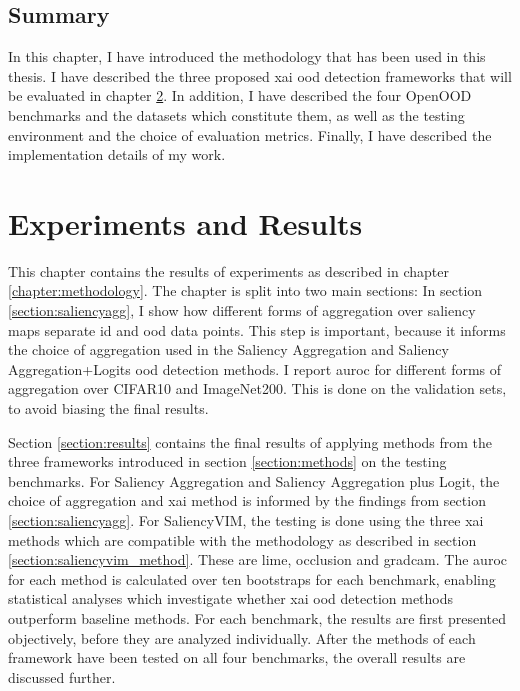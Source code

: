 \documentclass[UKenglish]{uiomasterthesis} %
\theoremstyle{definition}
\begin{document}
\section{Summary}

In this chapter, I have introduced the methodology that has been used in this thesis. I have described the three proposed \ac{xai} \ac{ood} detection frameworks that will be evaluated in chapter \ref{chapter:experiments}. In addition, I have described the four OpenOOD benchmarks and the datasets which constitute them, as well as the testing environment and the choice of evaluation metrics. Finally, I have described the implementation details of my work.

\chapter{Experiments and Results} \label{chapter:experiments}

This chapter contains the results of experiments as described in chapter \ref{chapter:methodology}. The chapter is split into two main sections: In section \ref{section:saliencyagg}, I show how different forms of aggregation over saliency maps separate \ac{id} and \ac{ood} data points. This step is important, because it informs the choice of aggregation used in the Saliency Aggregation and Saliency Aggregation+Logits \ac{ood} detection methods. I report \ac{auroc} for different forms of aggregation over CIFAR10 and ImageNet200. This is done on the validation sets, to avoid biasing the final results.

Section \ref{section:results} contains the final results of applying methods from the three frameworks introduced in section \ref{section:methods} on the testing benchmarks. For Saliency Aggregation and Saliency Aggregation plus Logit, the choice of aggregation and \ac{xai} method is informed by the findings from section \ref{section:saliencyagg}. For SaliencyVIM, the testing is done using the three \ac{xai} methods which are compatible with the methodology as described in section \ref{section:saliencyvim_method}. These are \ac{lime}, occlusion and \ac{gradcam}. The \ac{auroc} for each method is calculated over ten bootstraps for each benchmark, enabling statistical analyses which investigate whether \ac{xai} \ac{ood} detection methods outperform baseline methods. For each benchmark, the results are first presented objectively, before they are analyzed individually. After the methods of each framework have been tested on all four benchmarks, the overall results are discussed further.
\end{document}
